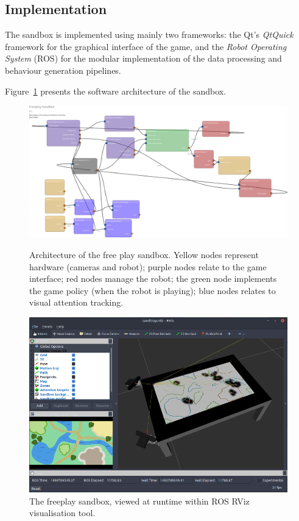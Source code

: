 \documentclass[a4paper]{article}
\begin{document}
\subsection{Implementation}

The sandbox is implemented using mainly two frameworks: the Qt's \emph{QtQuick} framework
for the graphical interface of the game, and the \emph{Robot Operating System}
(ROS) for the modular implementation of the data processing and behaviour
generation pipelines.

Figure~\ref{fig|architecture} presents the software architecture of the sandbox.

\begin{figure}
    \centering
    \includegraphics[width=\linewidth]{freeplay-sandbox-architecture}
\label{fig|architecture}
\caption{Architecture of the free play sandbox. Yellow nodes represent
    hardware (cameras and robot); purple nodes relate to the game interface;
    red nodes manage the robot; the green node implements the game policy (when
    the robot is playing); blue nodes relates to visual attention tracking.}
\end{figure}

\begin{figure}
    \centering
    \includegraphics[width=0.9\linewidth]{rviz-sandtray}
    \caption{The freeplay sandbox, viewed at runtime within ROS RViz
    visualisation tool.}
    \label{fig|rviz}
\end{figure}
\end{document}
